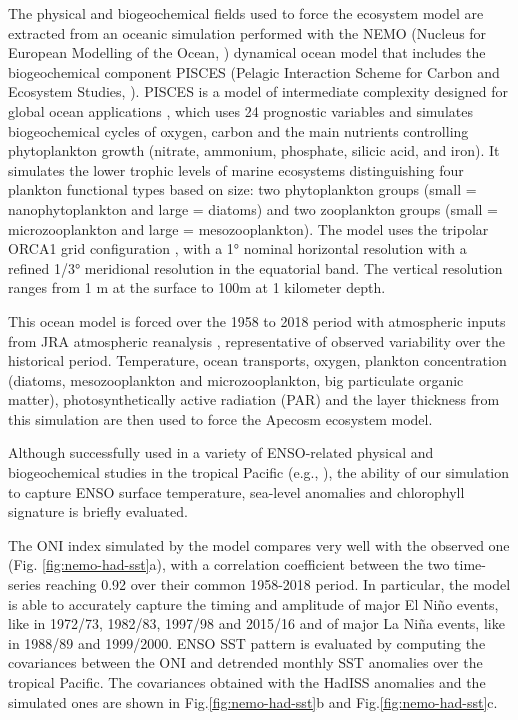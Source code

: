 The physical and biogeochemical fields used to force the ecosystem model are extracted from an oceanic simulation performed with the NEMO (Nucleus for European Modelling of the Ocean, \citealt{madecNEMOOceanEngine2019}) dynamical ocean model that includes the biogeochemical component PISCES (Pelagic Interaction Scheme for Carbon and Ecosystem Studies, \citealt{aumontPISCESv2OceanBiogeochemical2015}). PISCES is a model of intermediate complexity designed for global ocean applications \citep{aumontPISCESv2OceanBiogeochemical2015}, which uses 24 prognostic variables and simulates biogeochemical cycles of oxygen, carbon and the main nutrients controlling phytoplankton growth (nitrate, ammonium, phosphate, silicic acid, and iron). It simulates the lower trophic levels of marine ecosystems distinguishing four plankton functional types based on size: two phytoplankton groups (small = nanophytoplankton and large = diatoms) and two zooplankton groups (small = microzooplankton and large = mesozooplankton). The model uses the tripolar ORCA1 grid configuration \citep{madecGlobalOceanMesh1996}, with a 1° nominal horizontal resolution with a refined 1/3° meridional resolution in the equatorial band. The vertical resolution ranges from 1 m at the surface to 100m at 1 kilometer depth.

This ocean model is forced over the 1958 to 2018 period with atmospheric inputs from JRA atmospheric reanalysis \citep{kobayashiJRA55ReanalysisGeneral2015}, representative of observed variability over the historical period. Temperature, ocean transports, oxygen, plankton concentration (diatoms, mesozooplankton and microzooplankton, big particulate organic matter), photosynthetically active radiation (PAR) and the layer thickness from this simulation are then used to force the Apecosm ecosystem model.

Although successfully used in a variety of ENSO-related physical and biogeochemical studies in the tropical Pacific (e.g., \citealt{vialardModelStudyOceanic2001, lengaigneOceanResponseMarch2002, lengaigneInfluenceOceanicBiology2007, schneiderClimateinducedInterannualVariability2008, masottiLargescaleShiftsPhytoplankton2011, currieIndianOceanDipole2013}), the ability of our simulation to capture ENSO surface temperature, sea-level anomalies and chlorophyll signature is briefly evaluated. 

The ONI index simulated by the model compares very well with the observed one (Fig. \ref{fig:nemo-had-sst}a), with a correlation coefficient between the two time-series reaching 0.92 over their common 1958-2018 period. In particular, the model is able to accurately capture the timing and amplitude of major El Niño events, like in 1972/73, 1982/83, 1997/98 and 2015/16 and of major La Niña events, like in 1988/89 and 1999/2000. ENSO SST pattern is evaluated  by computing the covariances between the ONI and detrended monthly SST anomalies over the tropical Pacific. The covariances obtained with the HadISS anomalies and the simulated ones are shown in Fig.\ref{fig:nemo-had-sst}b and Fig.\ref{fig:nemo-had-sst}c.

